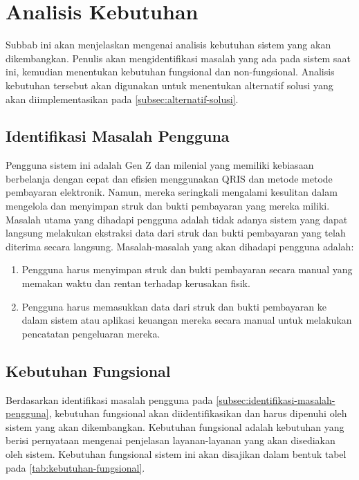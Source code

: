 \section{Analisis Kebutuhan}
\label{sec:analisis-kebutuhan}

Subbab ini akan menjelaskan mengenai analisis kebutuhan sistem yang akan dikembangkan. Penulis akan mengidentifikasi masalah yang ada pada sistem saat ini, kemudian menentukan kebutuhan fungsional dan non-fungsional. Analisis kebutuhan tersebut akan digunakan untuk menentukan alternatif solusi yang akan diimplementasikan pada \autoref{subsec:alternatif-solusi}.

\subsection{Identifikasi Masalah Pengguna}
\label{subsec:identifikasi-masalah-pengguna}
Pengguna sistem ini adalah Gen Z dan milenial yang memiliki kebiasaan berbelanja dengan cepat dan efisien menggunakan QRIS dan metode metode pembayaran elektronik. Namun, mereka seringkali mengalami kesulitan dalam mengelola dan menyimpan struk dan bukti pembayaran yang mereka miliki. Masalah utama yang dihadapi pengguna adalah tidak adanya sistem yang dapat langsung melakukan ekstraksi data dari struk dan bukti pembayaran yang telah diterima secara langsung. Masalah-masalah yang akan dihadapi pengguna adalah:
\begin{enumerate}
    \item Pengguna harus menyimpan struk dan bukti pembayaran secara manual yang memakan waktu dan rentan terhadap kerusakan fisik.
    \item Pengguna harus memasukkan data dari struk dan bukti pembayaran ke dalam sistem atau aplikasi keuangan mereka secara manual untuk melakukan pencatatan pengeluaran mereka.
\end{enumerate}

\subsection{Kebutuhan Fungsional}
\label{subsec:kebutuhan-fungsional}
Berdasarkan identifikasi masalah pengguna pada \autoref{subsec:identifikasi-masalah-pengguna}, kebutuhan fungsional akan diidentifikasikan dan harus dipenuhi oleh sistem yang akan dikembangkan. Kebutuhan fungsional adalah kebutuhan yang berisi pernyataan mengenai 
penjelasan layanan-layanan yang akan disediakan oleh sistem. Kebutuhan fungsional sistem ini akan disajikan dalam bentuk tabel pada \autoref{tab:kebutuhan-fungsional}.

